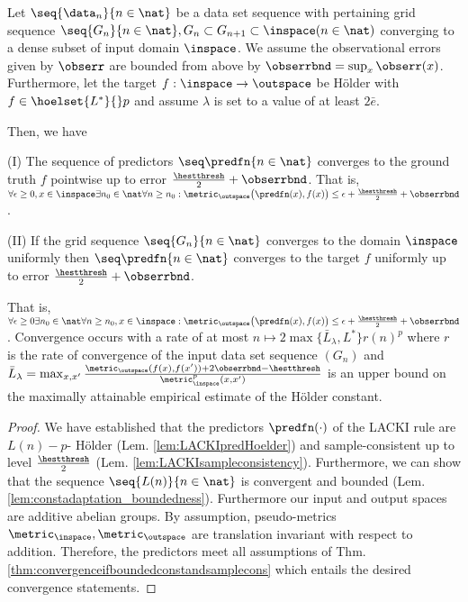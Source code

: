 \begin{thm} \label{thm:convergenceifboundedconstandsamplecons_LACKI}
Let $\seq{\data_n}{n \in \nat}$ be a data set sequence with pertaining grid sequence $\seq{G_n}{n \in \nat}, G_n \subset G_{n+1} \subset \inspace (n \in \nat)$ converging to a dense subset of input domain $\inspace$. 
We assume the observational errors given by $\obserr$ are bounded from above by $\obserrbnd= \sup_x \obserr(x)$.
Furthermore, let the target $f: \inspace \to \outspace$ be H\"older with $f \in \hoelset {L^*}{}  p$ and assume $\lambda$ is set to a value of at least $2 \bar e$.
%

Then, we have 

(I) The sequence of predictors $\seq \predfn {n \in \nat}$ converges to the ground truth $f$ pointwise up to error $\frac \hestthresh 2 +\obserrbnd$. That is, $\forall \epsilon \geq 0,  x \in \inspace \exists n_0 \in \nat \forall n \geq n_0: \metric_{\outspace}\bigl(\predfn(x), f(x) \bigr) \leq \epsilon + \frac \hestthresh 2 + \obserrbnd$.


(II) If the grid sequence $\seq{G_n}{n \in \nat }$ converges to the domain $\inspace$ uniformly then $\seq \predfn {n \in \nat}$ converges to the target $f$ uniformly up to error $ \frac \hestthresh 2 +\obserrbnd$. 

That is, $\forall \epsilon \geq 0 \exists n_0 \in \nat \forall n \geq n_0, x \in \inspace: \metric_{\outspace}\bigl(\predfn(x), f(x) \bigr) \leq \epsilon +   \frac \hestthresh 2  +\obserrbnd$.
Convergence occurs with a rate of at most $n \mapsto 2 \max\{\bar L_\lambda, L^* \} r(n)^p$ where $r$ is the rate of convergence of the input data set sequence $(G_n)$ and $\bar L_\lambda =\max_{x,x'} \frac{\metric_\outspace(f(x), f(x')) + 2 \obserrbnd -\hestthresh }{\metric_\inspace^p(x,x')}$ is an upper bound on the maximally attainable empirical estimate of the H\"older constant.

\begin{proof}
We have established that the predictors $\predfn(\cdot)$ of the LACKI rule are $L(n)-p$- H\"older (Lem. \ref{lem:LACKIpredHoelder}) and sample-consistent up to level $\frac \hestthresh 2$ (Lem. \ref{lem:LACKIsampleconsistency}). Furthermore, we can show that the sequence $\seq{L(n)}{n \in \nat}$ is convergent and bounded (Lem. \ref{lem:constadaptation_boundedness}). Furthermore our input and output spaces are additive abelian groups. By assumption, pseudo-metrics $\metric_\inspace,\metric_\outspace$ are translation invariant with respect to addition. Therefore, the predictors meet all assumptions of Thm. \ref{thm:convergenceifboundedconstandsamplecons} which entails the desired convergence statements.
\end{proof}
\end{thm}
